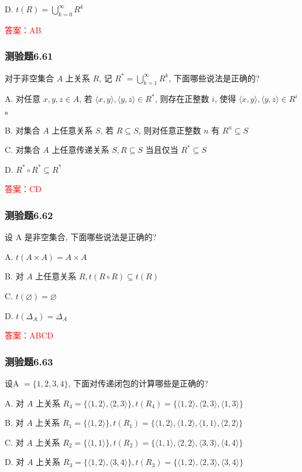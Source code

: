 \documentclass[UTF8, heading=true]{ctexart}
\begin{document}
D. $t(R)=\bigcup_{k=0}^{\infty} R^k$

\textcolor{red}{答案：AB}

\subsubsection{测验题6.61}
对于非空集合 $A$ 上关系 $R$, 记 $R^*=\bigcup_{k=1}^{\infty} R^k$, 下面哪些说法是正确的?

A. 对任意 $x, y, z \in A$, 若 $\langle x, y\rangle,\langle y, z\rangle \in R^*$, 则存在正整数 $i$, 使得 $\langle x, y\rangle,\langle y, z\rangle \in R^i$ 。

B. 对集合 $A$ 上任意关系 $S$, 若 $R \subseteq S$, 则对任意正整数 $n$ 有 $R^n \subseteq S$

C. 对集合 $A$ 上任意传递关系 $S, R \subseteq S$ 当且仅当 $R^* \subseteq S$

D. $R^* \circ R^* \subseteq R^*$

\textcolor{red}{答案：CD}


\subsubsection{测验题6.62}
设 A 是非空集合, 下面哪些说法是正确的?

A. $t(A \times A)=A \times A$

B. 对 $A$ 上任意关系 $R, t(R \circ R) \subseteq t(R)$

C. $t(\varnothing)=\varnothing$

D. $t\left(\Delta_A\right)=\Delta_A$

\textcolor{red}{答案：ABCD}

\subsubsection{测验题6.63}

设A $=\{1,2,3,4\}$, 下面对传递闭包的计算哪些是正确的?

A. 对 $A$ 上关系 $R_4=\{\langle 1,2\rangle,\langle 2,3\rangle\}, t\left(R_4\right)=\{\langle 1,2\rangle,\langle 2,3\rangle,\langle 1,3\rangle\}$

B. 对 $A$ 上关系 $R_1=\{\langle 1,2\rangle\}, t\left(R_1\right)=\{\langle 1,2\rangle,\langle 1,2\rangle,\langle 1,1\rangle,\langle 2,2\rangle\}$

C. 对 $A$ 上关系 $R_2=\{\langle 1,1\rangle\}, t\left(R_2\right)=\{\langle 1,1\rangle,\langle 2,2\rangle,\langle 3,3\rangle,\langle 4,4\rangle\}$

D. 对 $A$ 上关系 $R_3=\{\langle 1,2\rangle,\langle 3,4\rangle\}, t\left(R_3\right)=\{\langle 1,2\rangle,\langle 2,3\rangle,\langle 3,4\rangle\}$
\end{document}
